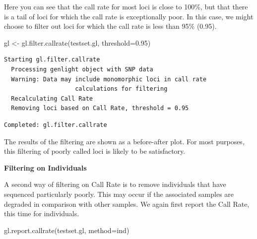 \documentclass[
  letterpaper,
  DIV=11,
  numbers=noendperiod]{scrreprt}
\newenvironment{Shaded}{\begin{snugshade}}{\end{snugshade}}
\newcommand{\AttributeTok}[1]{\textcolor[rgb]{0.49,0.56,0.16}{#1}}
\newcommand{\FloatTok}[1]{\textcolor[rgb]{0.25,0.63,0.44}{#1}}
\newcommand{\FunctionTok}[1]{\textcolor[rgb]{0.02,0.16,0.49}{#1}}
\newcommand{\NormalTok}[1]{\textcolor[rgb]{0.00,0.44,0.13}{#1}}
\newcommand{\OtherTok}[1]{\textcolor[rgb]{0.00,0.44,0.13}{#1}}
\newcommand{\StringTok}[1]{\textcolor[rgb]{0.25,0.44,0.63}{#1}}
\let\textttOrig\texttt
\renewcommand{\texttt}[1]{\textttOrig{\color{blue}{#1}}}
\begin{document}
Here you can see that the call rate for most loci is close to 100\%, but
that there is a tail of loci for which the call rate is exceptionally
poor. In this case, we might choose to filter out loci for which the
call rate is less than 95\% (0.95).

\begin{Shaded}
\begin{Highlighting}[]
\NormalTok{gl }\OtherTok{\textless{}{-}} \FunctionTok{gl.filter.callrate}\NormalTok{(testset.gl, }\AttributeTok{threshold=}\FloatTok{0.95}\NormalTok{)}
\end{Highlighting}
\end{Shaded}

\begin{verbatim}
Starting gl.filter.callrate 
  Processing genlight object with SNP data
  Warning: Data may include monomorphic loci in call rate 
                    calculations for filtering
  Recalculating Call Rate
  Removing loci based on Call Rate, threshold = 0.95 
\end{verbatim}

\begin{figure}[H]

{\centering \texttt{[image: basicfiltering\_files/figure-pdf/unnamed-chunk-5-1.pdf]}

}

\end{figure}

\begin{verbatim}
Completed: gl.filter.callrate 
\end{verbatim}

The results of the filtering are shown as a before-after plot. For most
purposes, this filtering of poorly called loci is likely to be
satisfactory.

\textbf{Filtering on Individuals}

A second way of filtering on Call Rate is to remove individuals that
have sequenced particularly poorly. This may occur if the associated
samples are degraded in comparison with other samples. We again first
report the Call Rate, this time for individuals.

\begin{Shaded}
\begin{Highlighting}[]
\FunctionTok{gl.report.callrate}\NormalTok{(testset.gl, }\AttributeTok{method=}\StringTok{\textquotesingle{}ind\textquotesingle{}}\NormalTok{)}
\end{Highlighting}
\end{Shaded}
\end{document}
